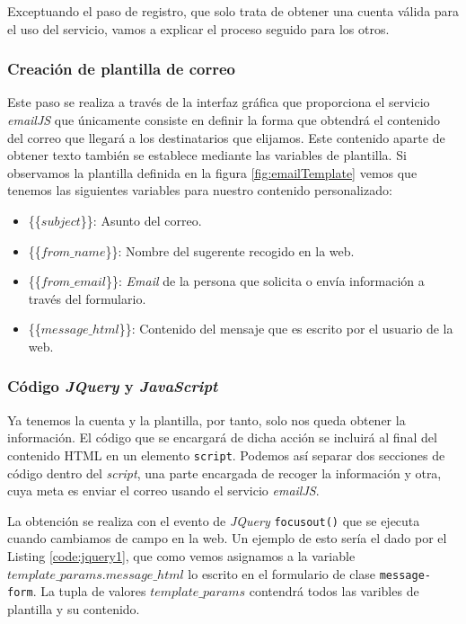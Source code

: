 Exceptuando el paso de registro, que solo trata de obtener una cuenta válida para el uso del servicio, vamos a explicar el proceso seguido para los otros. 

\subsubsection*{Creación de plantilla de correo}
Este paso se realiza a través de la interfaz gráfica que proporciona el servicio \textit{emailJS} que únicamente consiste en definir la forma que obtendrá el contenido del correo que llegará a los destinatarios que elijamos. Este contenido aparte de obtener texto también se establece mediante las variables de plantilla. Si observamos la plantilla definida en la figura \ref{fig:emailTemplate} vemos que tenemos las siguientes variables para nuestro contenido personalizado:
\begin{itemize}
    \item \{\{$subject$\}\}: Asunto del correo.
    \item \{\{$from\_name$\}\}: Nombre del sugerente recogido en la web. 
    \item \{\{$from\_email$\}\}: \textit{Email} de la persona que solicita o envía información a través del formulario.
    \item \{\{$message\_html$\}\}: Contenido del mensaje que es escrito por el usuario de la web.
\end{itemize}

\subsubsection*{Código \textit{JQuery} y \textit{JavaScript}}
Ya tenemos la cuenta y la plantilla, por tanto, solo nos queda obtener la información. El código que se encargará de dicha acción se incluirá al final del contenido HTML en un elemento \texttt{script}. Podemos así separar dos secciones de código dentro del \textit{script}, una parte encargada de recoger la información y otra, cuya meta es enviar el correo usando el servicio \textit{emailJS}.

La obtención se realiza con el evento de \textit{JQuery} \texttt{focusout()} que se ejecuta cuando cambiamos de campo en la web. Un ejemplo de esto sería el dado por el Listing \ref{code:jquery1}, que como vemos asignamos a la variable \texttt{$template\_params.message\_html$} lo escrito en el formulario de clase \texttt{message-form}. La tupla de valores \texttt{$template\_params$} contendrá todos las varibles de plantilla y su contenido. 

